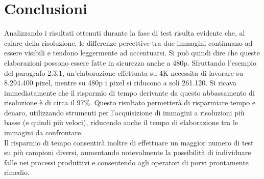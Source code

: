 \documentclass[a4paper,11pt]{article}
\begin{document}
    \newpage
    \section{Conclusioni} 
    Analizzando i risultati ottenuti durante la fase di test risulta evidente che, al calare della risoluzione, 
    le differenze percettive tra due immagini continuano ad essere visibili e tendono leggermente ad accentuarsi.
    Si può quindi dire che queste elaborazioni possono essere fatte in sicurezza anche a 480p. 
    Sfruttando l'esempio del paragrafo 2.3.1, un'elaborazione effettuata su 4K necessita di lavorare su 8.294.400 pixel, mentre su 480p i pixel si riducono a soli 261.120.
    Si ricava immediatamente che il risparmio di tempo derivante da questo abbassamento di risoluzione è di circa il 97\%.
    Questo risultato permetterà di risparmiare tempo e denaro, utilizzando strumenti per l'acquisizione di immagini
    a risoluzioni più basse (e quindi più veloci), riducendo anche il tempo di elaborazione tra le immagini da confrontare.\\
    Il risparmio di tempo consentirà inoltre di effettuare un maggior numero di test su più campioni diversi, aumentando notevolmente la possibilità di individuare falle 
    nei processi produttivi e consentendo agli operatori di porvi prontamente rimedio.
    \newpage
\end{document}
